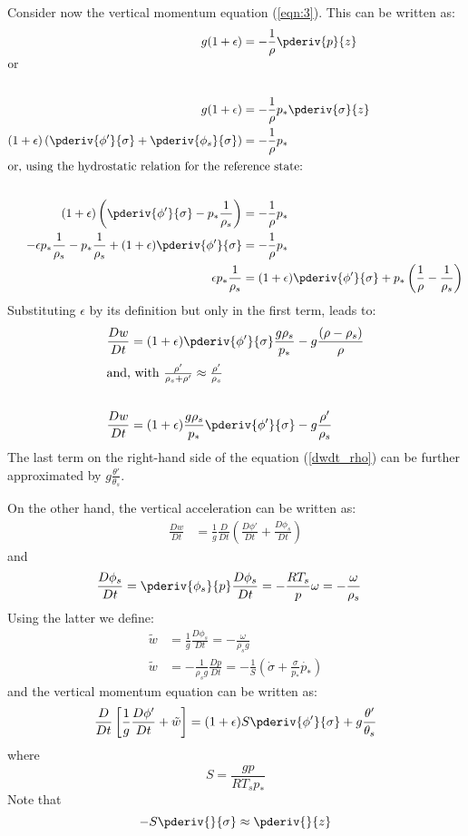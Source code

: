 Consider now the vertical momentum equation (\ref{eqn:3}). This can be written as:
\begin{align}
g(1+\epsilon)&=-\frac{1}{\rho}\pderiv{p}{z} \\
\intertext{or} \nonumber\\
g(1+\epsilon)&=-\frac{1}{\rho}p_*\pderiv{\sigma}{z} \nonumber\\
(1+\epsilon)\left(\pderiv{\phi'}{\sigma}+\pderiv{\phi_s}{\sigma}\right)&=-\frac{1}{\rho}p_*\nonumber\\
\intertext{or, using the hydrostatic relation for the reference state:} \nonumber \\
(1+\epsilon)\left(\pderiv{\phi'}{\sigma}-p_*\frac{1}{\rho_s}\right)&=-\frac{1}{\rho}p_*\nonumber\\
-\epsilon p_*\frac{1}{\rho_s}-p_*\frac{1}{\rho_s}+(1+\epsilon)\pderiv{\phi'}{\sigma}&=-\frac{1}{\rho}p_*\nonumber\\
\epsilon p_*\frac{1}{\rho_s}&=(1+\epsilon)\pderiv{\phi'}{\sigma}+p_*\left(\frac{1}{\rho}-\frac{1}{\rho_s}\right)
\end{align}
Substituting $\epsilon$ by its definition but only in the first term, leads to:
\begin{align}
\frac{Dw}{Dt}&=(1+\epsilon)\pderiv{\phi'}{\sigma}\frac{g\rho_s}{p_*}-g\frac{(\rho-\rho_s)}{\rho}\nonumber\\
\intertext{and, with $\frac{\rho'}{\rho_s+\rho'}\approx\frac{\rho'}{\rho_s}$} \nonumber\\
\frac{Dw}{Dt}&=(1+\epsilon)\frac{g\rho_s}{p_*}\pderiv{\phi'}{\sigma}-g\frac{\rho'}{\rho_s} \label{dwdt_rho}
\end{align}
The last term on the right-hand side of the equation (\ref{dwdt_rho}) can be further approximated by $g\frac{\theta'}{\theta_s}$.

On the other hand, the vertical acceleration can be written as:
\begin{align}
\frac{Dw}{Dt}&=\frac{1}{g}\frac{D}{Dt}\left(\frac{D\phi'}{Dt}+\frac{D\phi_s}{Dt}\right)
\end{align}
and
\begin{align}
\frac{D\phi_s}{Dt}&=\pderiv{\phi_s}{p}\frac{D\phi_s}{Dt}=-\frac{RT_s}{p}\omega=-\frac{\omega}{\rho_s}
\end{align}
Using the latter we define:
\begin{align}
\tilde{w}&=\frac{1}{g}\frac{D\phi_s}{Dt}=-\frac{\omega}{\rho_sg} \\
\tilde{w}&=-\frac{1}{\rho_sg}\frac{Dp}{Dt}=-\frac{1}{S}(\dot{\sigma}+\frac{\sigma}{p_*}\dot{p_*})
\end{align}
and the vertical momentum equation can be written as:
\begin{equation}
\frac{D}{Dt}\left[\frac{1}{g}\frac{D\phi'}{Dt}+\tilde{w}\right]=(1+\epsilon)S\pderiv{\phi'}{\sigma}+g\frac{\theta'}{\theta_s}
\end{equation}
where 
\begin{equation}
S=\frac{gp}{RT_sp_*}
\end{equation}
Note that
\begin{equation}
-S\pderiv{}{\sigma}\approx\pderiv{}{z} \label{dz}
\end{equation}

